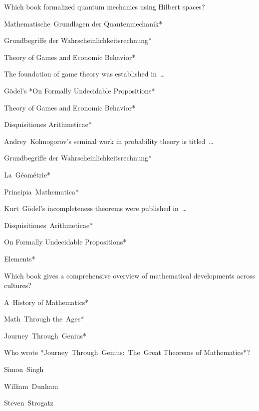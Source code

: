 \begin{enhancedmcq}{Which book formalized quantum mechanics using Hilbert spaces?}
\item *Mathematische Grundlagen der Quantenmechanik*
\item *Grundbegriffe der Wahrscheinlichkeitsrechnung*
\item *Theory of Games and Economic Behavior*

\end{enhancedmcq}
\begin{enhancedmcq}{The foundation of game theory was established in …}
\item Gödel's *On Formally Undecidable Propositions*
\item *Theory of Games and Economic Behavior*
\item *Disquisitiones Arithmeticae*

\end{enhancedmcq}
\begin{enhancedmcq}{Andrey Kolmogorov's seminal work in probability theory is titled …}
\item *Grundbegriffe der Wahrscheinlichkeitsrechnung*
\item *La Géométrie*
\item *Principia Mathematica*

\end{enhancedmcq}
\begin{enhancedmcq}{Kurt Gödel's incompleteness theorems were published in …}
\item *Disquisitiones Arithmeticae*
\item *On Formally Undecidable Propositions*
\item *Elements*

\end{enhancedmcq}
\begin{enhancedmcq}{Which book gives a comprehensive overview of mathematical developments across cultures?}
\item *A History of Mathematics*
\item *Math Through the Ages*
\item *Journey Through Genius*

\end{enhancedmcq}
\begin{enhancedmcq}{Who wrote *Journey Through Genius: The Great Theorems of Mathematics*?}
\item Simon Singh
\item William Dunham
\item Steven Strogatz

\end{enhancedmcq}
